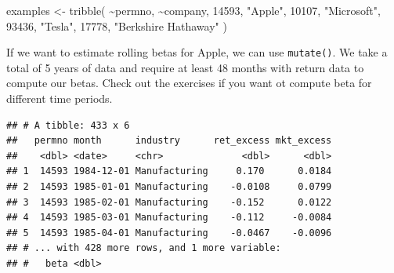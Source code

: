 \documentclass[
]{krantz}
\newenvironment{Shaded}{\begin{snugshade}}{\end{snugshade}}
\newcommand{\AttributeTok}[1]{\textcolor[rgb]{0.61,0.61,0.61}{#1}}
\newcommand{\DecValTok}[1]{\textcolor[rgb]{0.06,0.06,0.06}{#1}}
\newcommand{\FunctionTok}[1]{\textcolor[rgb]{0,0,0}{#1}}
\newcommand{\NormalTok}[1]{#1}
\newcommand{\OtherTok}[1]{\textcolor[rgb]{0.37,0.37,0.37}{#1}}
\newcommand{\SpecialCharTok}[1]{\textcolor[rgb]{0,0,0}{#1}}
\newcommand{\StringTok}[1]{\textcolor[rgb]{0.5,0.5,0.5}{#1}}
\begin{document}
\begin{Shaded}
\begin{Highlighting}[]
\NormalTok{examples }\OtherTok{\textless{}{-}} \FunctionTok{tribble}\NormalTok{(}
  \SpecialCharTok{\textasciitilde{}}\NormalTok{permno, }\SpecialCharTok{\textasciitilde{}}\NormalTok{company,}
  \DecValTok{14593}\NormalTok{, }\StringTok{"Apple"}\NormalTok{,}
  \DecValTok{10107}\NormalTok{, }\StringTok{"Microsoft"}\NormalTok{,}
  \DecValTok{93436}\NormalTok{, }\StringTok{"Tesla"}\NormalTok{,}
  \DecValTok{17778}\NormalTok{, }\StringTok{"Berkshire Hathaway"}
\NormalTok{)}
\end{Highlighting}
\end{Shaded}

If we want to estimate rolling betas for Apple, we can use \texttt{mutate()}.
We take a total of 5 years of data and require at least 48 months with return data to compute our betas.
Check out the exercises if you want ot compute beta for different time periods.

\begin{Shaded}
\end{Shaded}

\begin{verbatim}
## # A tibble: 433 x 6
##   permno month      industry      ret_excess mkt_excess
##    <dbl> <date>     <chr>              <dbl>      <dbl>
## 1  14593 1984-12-01 Manufacturing     0.170      0.0184
## 2  14593 1985-01-01 Manufacturing    -0.0108     0.0799
## 3  14593 1985-02-01 Manufacturing    -0.152      0.0122
## 4  14593 1985-03-01 Manufacturing    -0.112     -0.0084
## 5  14593 1985-04-01 Manufacturing    -0.0467    -0.0096
## # ... with 428 more rows, and 1 more variable:
## #   beta <dbl>
\end{verbatim}
\end{document}
